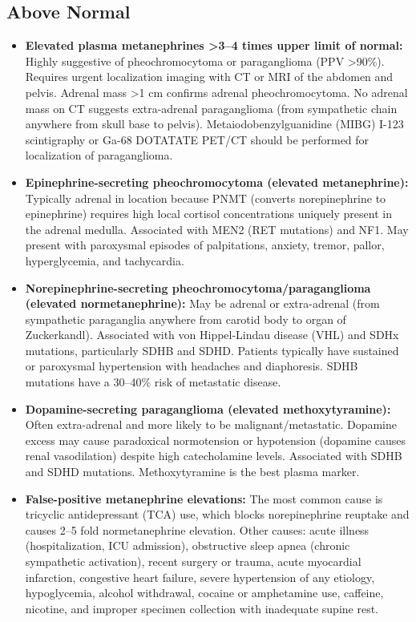 \subsection*{Above Normal}
\begin{itemize}
  \item \textbf{Elevated plasma metanephrines >3--4 times upper limit of normal:} Highly suggestive of pheochromocytoma or paraganglioma (PPV >90\%). Requires urgent localization imaging with CT or MRI of the abdomen and pelvis. Adrenal mass >1 cm confirms adrenal pheochromocytoma. No adrenal mass on CT suggests extra-adrenal paraganglioma (from sympathetic chain anywhere from skull base to pelvis). Metaiodobenzylguanidine (MIBG) I-123 scintigraphy or Ga-68 DOTATATE PET/CT should be performed for localization of paraganglioma.
  \item \textbf{Epinephrine-secreting pheochromocytoma (elevated metanephrine):} Typically adrenal in location because PNMT (converts norepinephrine to epinephrine) requires high local cortisol concentrations uniquely present in the adrenal medulla. Associated with MEN2 (RET mutations) and NF1. May present with paroxysmal episodes of palpitations, anxiety, tremor, pallor, hyperglycemia, and tachycardia.
  \item \textbf{Norepinephrine-secreting pheochromocytoma/paraganglioma (elevated normetanephrine):} May be adrenal or extra-adrenal (from sympathetic paraganglia anywhere from carotid body to organ of Zuckerkandl). Associated with von Hippel-Lindau disease (VHL) and SDHx mutations, particularly SDHB and SDHD. Patients typically have sustained or paroxysmal hypertension with headaches and diaphoresis. SDHB mutations have a 30--40\% risk of metastatic disease.
  \item \textbf{Dopamine-secreting paraganglioma (elevated methoxytyramine):} Often extra-adrenal and more likely to be malignant/metastatic. Dopamine excess may cause paradoxical normotension or hypotension (dopamine causes renal vasodilation) despite high catecholamine levels. Associated with SDHB and SDHD mutations. Methoxytyramine is the best plasma marker.
  \item \textbf{False-positive metanephrine elevations:} The most common cause is tricyclic antidepressant (TCA) use, which blocks norepinephrine reuptake and causes 2--5 fold normetanephrine elevation. Other causes: acute illness (hospitalization, ICU admission), obstructive sleep apnea (chronic sympathetic activation), recent surgery or trauma, acute myocardial infarction, congestive heart failure, severe hypertension of any etiology, hypoglycemia, alcohol withdrawal, cocaine or amphetamine use, caffeine, nicotine, and improper specimen collection with inadequate supine rest.

\end{itemize}
